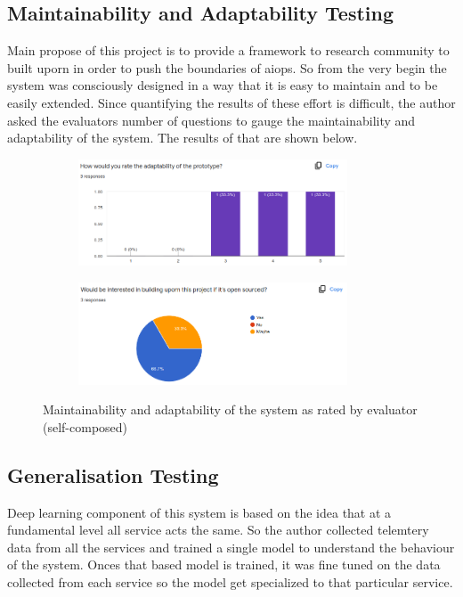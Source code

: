 \subsection{Maintainability and Adaptability Testing}

Main propose of this project is to provide a framework to research community to built uporn in order to push the boundaries of \ac{aiops}. So from the very begin the system was consciously designed in a way that it is easy to maintain and to be easily extended. Since quantifying the results of these effort is difficult, the author asked the evaluators number of questions to gauge the maintainability and adaptability of the system. The results of that are shown below.

\begin{figure}[H]
    \centering
    \begin{subfigure}[bH]{0.49\textwidth}
        \centering
        \includegraphics[width=8cm]{assets/testing/adaptability.png}
    \end{subfigure}
    \hfill
    \begin{subfigure}[bH]{0.49\textwidth}
        \centering
        \includegraphics[width=8cm]{assets/testing/build-uporn.png}
    \end{subfigure}
    \hfill
    \caption{Maintainability and adaptability of the system as rated by evaluator (self-composed)}
\end{figure}


\subsection{Generalisation Testing}

Deep learning component of this system is based on the idea that at a fundamental level all service acts the same. So the author collected telemtery data from all the services and trained a single model to understand the  behaviour of the system. Onces that based model is trained, it was fine tuned on the data collected from each service so the model get specialized to that particular service.

